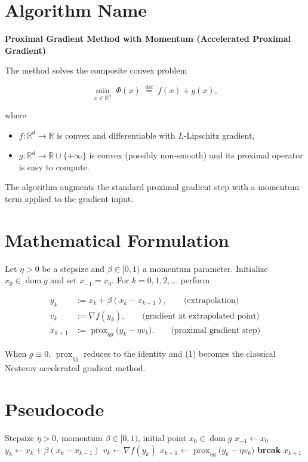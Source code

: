 \documentclass{article}
\newcommand{\prox}{\operatorname{prox}}
\newcommand{\grad}{\nabla}
\begin{document}
\section*{Algorithm Name}
\textbf{Proximal Gradient Method with Momentum (Accelerated Proximal Gradient)}  

The method solves the composite convex problem  

\[
\min_{x\in\mathbb{R}^d}\; \Phi(x)\;\stackrel{\text{def}}{=}\; f(x)+g(x),
\]

where  

\begin{itemize}
  \item $f:\mathbb{R}^d\rightarrow\mathbb{R}$ is convex and differentiable with $L$‑Lipschitz gradient,
  \item $g:\mathbb{R}^d\rightarrow\mathbb{R}\cup\{+\infty\}$ is convex (possibly non‑smooth) and its proximal operator is easy to compute.
\end{itemize}

The algorithm augments the standard proximal gradient step with a momentum term applied to the gradient input.

\section*{Mathematical Formulation}
Let $\eta>0$ be a stepsize and $\beta\in[0,1)$ a momentum parameter.  
Initialize $x_0\in\operatorname{dom}g$ and set $x_{-1}=x_0$.  
For $k=0,1,2,\dots$ perform  

\[
\begin{aligned}
y_k          &:= x_k + \beta (x_k-x_{k-1}) , \qquad\text{(extrapolation)}\\
v_k          &:= \grad f(y_k), \qquad\text{(gradient at extrapolated point)}\\
x_{k+1}      &:= \prox_{\eta g}\!\bigl( y_k - \eta v_k \bigr). \qquad\text{(proximal gradient step)}
\end{aligned}
\tag{1}
\]

When $g\equiv 0$, $\prox_{\eta g}$ reduces to the identity and (1) becomes the classical Nesterov accelerated gradient method.

\section*{Pseudocode}
\begin{algorithm}[H]
\caption{Accelerated Proximal Gradient (APG)}\label{alg:apg}
\begin{algorithmic}[1]
\Require Stepsize $\eta>0$, momentum $\beta\in[0,1)$, initial point $x_0\in\operatorname{dom}g$
\State $x_{-1}\gets x_0$
    \State $y_k \gets x_k + \beta (x_k - x_{k-1})$ 
    \State $v_k \gets \grad f(y_k)$ 
    \State $x_{k+1} \gets \prox_{\eta g}\bigl( y_k - \eta v_k \bigr)$ 
        \State \textbf{break}
    \EndIf
\EndFor
\State \Return $x_{k+1}$
\end{algorithmic}
\end{algorithm}
\end{document}
